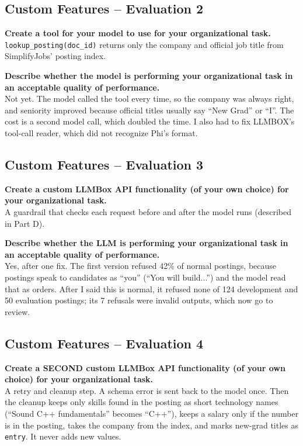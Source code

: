 \documentclass[11pt]{article}
\newcommand{\q}[1]{\par\noindent\textbf{#1}\\}
\begin{document}
\subsection{Custom Features -- Evaluation 2}

\q{Create a tool for your model to use for your organizational task.}
\texttt{lookup\_posting(doc\_id)} returns only the company and official job title from SimplifyJobs' posting index.

\q{Describe whether the model is performing your organizational task in an acceptable quality of performance.}
Not yet. The model called the tool every time, so the company was always right, and seniority improved because official titles usually say ``New Grad'' or ``I''. The cost is a second model call, which doubled the time. I also had to fix LLMBOX's tool-call reader, which did not recognize Phi's format.

\subsection{Custom Features -- Evaluation 3}

\q{Create a custom LLMBox API functionality (of your own choice) for your organizational task.}
A guardrail that checks each request before and after the model runs (described in Part D).

\q{Describe whether the LLM is performing your organizational task in an acceptable quality of performance.}
Yes, after one fix. The first version refused 42\% of normal postings, because postings speak to candidates as ``you'' (``You will build...'') and the model read that as orders. After I said this is normal, it refused none of 124 development and 50 evaluation postings; its 7 refusals were invalid outputs, which now go to review.

\subsection{Custom Features -- Evaluation 4}

\q{Create a SECOND custom LLMBox API functionality (of your own choice) for your organizational task.}
A retry and cleanup step. A schema error is sent back to the model once. Then the cleanup keeps only skills found in the posting as short technology names (``Sound C++ fundamentals'' becomes ``C++''), keeps a salary only if the number is in the posting, takes the company from the index, and marks new-grad titles as \texttt{entry}. It never adds new values.
\end{document}
